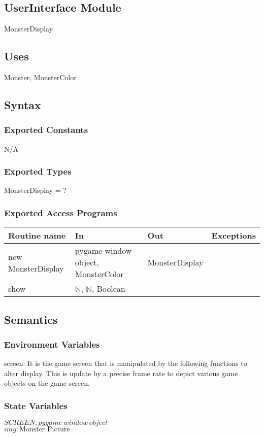 \documentclass[12pt]{article}
\begin{document}
\subsection*{UserInterface Module}
MonsterDisplay
\subsection*{Uses}
Monster, MonsterColor

\subsection*{Syntax}
\subsubsection*{Exported Constants}
N/A
\subsubsection*{Exported Types}
MonsterDisplay = ?

\subsubsection*{Exported Access Programs}
\begin{tabular}{| l | l | l | l |}
\hline
\textbf{Routine name} & \textbf{In} & \textbf{Out} & \textbf{Exceptions}\\
\hline
new MonsterDisplay&pygame window object, MonsterColor&     MonsterDisplay  & \\
\hline
show       &	$\mathbb{N}$,	$\mathbb{N}$, Boolean      &           &          \\
\hline
\end{tabular}

\subsection*{Semantics}
\subsubsection*{Environment Variables}
screen: It is the game screen that is manipulated by the following functions to alter display. This is update by a precise frame rate to depict various game objects on the game screen.

\subsubsection*{State Variables}
$SCREEN: pygame\ window\ object$\\
$img: \text{Monster Picture}$
\end{document}
